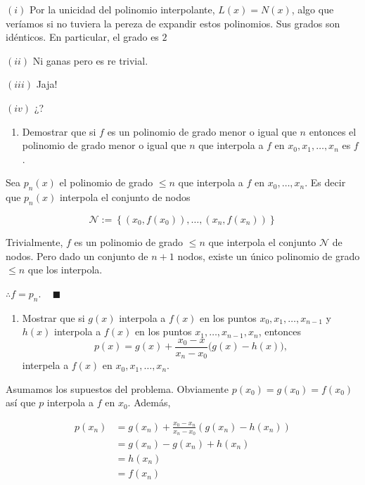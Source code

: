 \documentclass[12pt]{article}
\begin{document}
$(i)$ Por la unicidad del polinomio interpolante, $L(x) = N(x)$, algo que
veríamos si no tuviera la pereza de expandir estos polinomios. Sus grados son
idénticos. En particular, el grado es $2$

$(i i )$ Ni ganas pero es re trivial. 

$(i i i)$ Jaja! 

$(iv)$ ¿?

\pagebreak 

\begin{myframe}
    \begin{enumerate}
\item[2.] Demostrar que si $f$ es un polinomio de grado menor o igual que $n$ entonces el polinomio de grado menor o igual que $n$ que interpola a $f$ en $x_0, x_1, \ldots, x_n$ es $f$.
\end{enumerate}
\end{myframe}

Sea $p_n(x)$ el polinomio de grado $\leq n$ que interpola a $f$ en $x_0, \ldots,
x_n$. Es decir que $p_n(x)$ interpola el conjunto de nodos

\begin{equation*}
    \mathcal{N} := \left\{ \left( x_0, f\left( x_0 \right)  \right), \ldots, \left( x_n, f\left( x_n \right)  \right)  \right\} 
\end{equation*}

Trivialmente, $f$ es un polinomio de grado $\leq n$ que interpola el conjunto
$\mathcal{N}$ de nodos. Pero dado un conjunto de $n+1$ nodos, existe un único
polinomio de grado $\leq n$ que los interpola.

$\therefore f = p_n$. ~ $\blacksquare$

\pagebreak 

\begin{myframe}
    \begin{enumerate}
\item[3.] Mostrar que si $g(x)$ interpola a $f(x)$ en los puntos $x_0, x_1, \ldots, x_{n-1}$ y $h(x)$ interpola a $f(x)$ en los puntos $x_1, \ldots, x_{n-1}, x_n$, entonces
\[
p(x) = g(x) + \frac{x_0 - x}{x_n - x_0}\bigl(g(x) - h(x)\bigr),
\]
interpela a $f(x)$ en $x_0, x_1, \ldots, x_n$.
\end{enumerate}
\end{myframe}

Asumamos los supuestos del problema. Obviamente $p(x_0) = g(x_0) = f(x_0)$ así
que $p$ interpola a $f$ en $x_0$. Además, 

\begin{align*}
    p(x_n) 
    &= g(x_n) + \frac{x_0 - x_n}{x_n - x_0} \left( g(x_n) - h(x_n) \right) \\ 
    &=g(x_n) - g(x_n) + h(x_n) \\ 
    &=h(x_n) \\ 
    &= f(x_n)
\end{align*}
\end{document}
